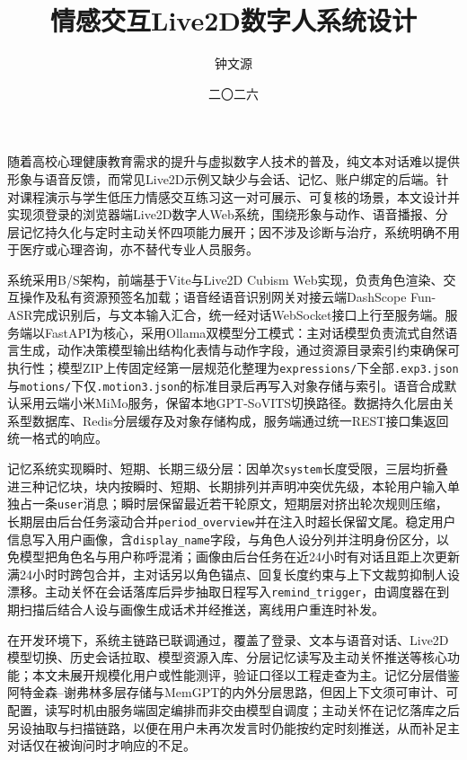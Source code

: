 \documentclass{base}
\title{情感交互Live2D数字人系统设计}
\author{钟文源}
\date{二〇二六}{六}{2026}
\begin{document}
\begingroup
\sloppy
\maketitle
\tableofcontents
\endgroup

\begin{cnabstract}
    随着高校心理健康教育需求的提升与虚拟数字人技术的普及，纯文本对话难以提供形象与语音反馈，而常见Live2D示例又缺少与会话、记忆、账户绑定的后端。针对课程演示与学生低压力情感交互练习这一对可展示、可复核的场景，本文设计并实现须登录的浏览器端Live2D数字人Web系统，围绕形象与动作、语音播报、分层记忆持久化与定时主动关怀四项能力展开；因不涉及诊断与治疗，系统明确不用于医疗或心理咨询，亦不替代专业人员服务。

    系统采用B/S架构，前端基于Vite与Live2D Cubism Web实现，负责角色渲染、交互操作及私有资源预签名加载；语音经语音识别网关对接云端DashScope Fun-ASR完成识别后，与文本输入汇合，统一经对话WebSocket接口上行至服务端。服务端以FastAPI为核心，采用Ollama双模型分工模式：主对话模型负责流式自然语言生成，动作决策模型输出结构化表情与动作字段，通过资源目录索引约束确保可执行性；模型ZIP上传固定经第一层规范化整理为\texttt{expressions/}下全部\texttt{.exp3.json}与\texttt{motions/}下仅\texttt{.motion3.json}的标准目录后再写入对象存储与索引。语音合成默认采用云端小米MiMo服务，保留本地GPT-SoVITS切换路径。数据持久化层由关系型数据库、Redis分层缓存及对象存储构成，服务端通过统一REST接口集返回统一格式的响应。

    记忆系统实现瞬时、短期、长期三级分层：因单次\texttt{system}长度受限，三层均折叠进三种记忆块，块内按瞬时、短期、长期排列并声明冲突优先级，本轮用户输入单独占一条\texttt{user}消息；瞬时层保留最近若干轮原文，短期层对挤出轮次规则压缩，长期层由后台任务滚动合并\texttt{period\_overview}并在注入时超长保留文尾。稳定用户信息写入用户画像，含\texttt{display\_name}字段，与角色人设分列并注明身份区分，以免模型把角色名与用户称呼混淆；画像由后台任务在近24小时有对话且距上次更新满24小时时跨包合并，主对话另以角色锚点、回复长度约束与上下文裁剪抑制人设漂移。主动关怀在会话落库后异步抽取日程写入\texttt{remind\_trigger}，由调度器在到期扫描后结合人设与画像生成话术并经推送，离线用户重连时补发。

    在开发环境下，系统主链路已联调通过，覆盖了登录、文本与语音对话、Live2D模型切换、历史会话拉取、模型资源入库、分层记忆读写及主动关怀推送等核心功能；本文未展开规模化用户或性能测评，验证口径以工程走查为主。记忆分层借鉴阿特金森--谢弗林多层存储与MemGPT的内外分层思路，但因上下文须可审计、可配置，读写时机由服务端固定编排而非交由模型自调度；主动关怀在记忆落库之后另设抽取与扫描链路，以便在用户未再次发言时仍能按约定时刻推送，从而补足主对话仅在被询问时才响应的不足。

\end{cnabstract}
\end{document}
